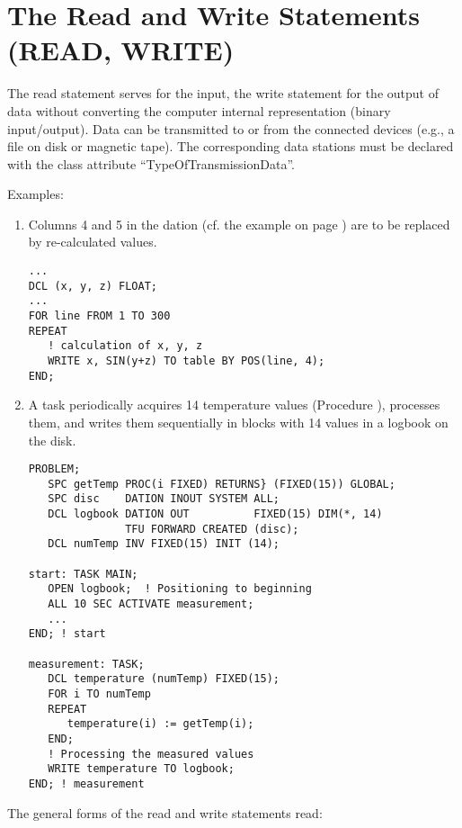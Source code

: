 \section{The Read and Write Statements (READ, WRITE)}   %
\label{sec_read_write}

The read statement serves for the input, the write statement for the
output of data without converting the computer internal representation
(binary input/output). Data can be transmitted to or from the connected
devices (e.g., a file on disk or magnetic tape). The corresponding data
stations must be declared with the class attribute
``TypeOfTransmissionData''.

Examples:

\begin{enumerate}
\item Columns 4 and 5 in the dation   (cf. the example on page
\pageref{example}) are to be replaced by re-calculated values.

\begin{lstlisting}
...
DCL (x, y, z) FLOAT;
...
FOR line FROM 1 TO 300
REPEAT
   ! calculation of x, y, z
   WRITE x, SIN(y+z) TO table BY POS(line, 4);
END;
\end{lstlisting}

\item A task  periodically acquires 14 temperature values
(Procedure ), processes them, and writes them sequentially in
blocks with 14 values in a logbook on the disk.

\begin{lstlisting}
PROBLEM;
   SPC getTemp PROC(i FIXED) RETURNS} (FIXED(15)) GLOBAL;
   SPC disc    DATION INOUT SYSTEM ALL;
   DCL logbook DATION OUT          FIXED(15) DIM(*, 14)
               TFU FORWARD CREATED (disc);
   DCL numTemp INV FIXED(15) INIT (14);

start: TASK MAIN;
   OPEN logbook;  ! Positioning to beginning
   ALL 10 SEC ACTIVATE measurement;
   ... 
END; ! start

measurement: TASK;
   DCL temperature (numTemp) FIXED(15); 
   FOR i TO numTemp
   REPEAT
      temperature(i) := getTemp(i);
   END;
   ! Processing the measured values
   WRITE temperature TO logbook; 
END; ! measurement
\end{lstlisting}
\end{enumerate}

The general forms of the read and write statements read:

